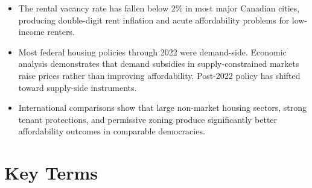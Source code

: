 \begin{itemize}
  \item The rental vacancy rate has fallen below 2\% in most major
        Canadian cities, producing double-digit rent inflation and
        acute affordability problems for low-income renters.

  \item Most federal housing policies through 2022 were demand-side.
        Economic analysis demonstrates that demand subsidies in
        supply-constrained markets raise prices rather than improving
        affordability. Post-2022 policy has shifted toward supply-side
        instruments.

  \item International comparisons show that large non-market housing
        sectors, strong tenant protections, and permissive zoning produce
        significantly better affordability outcomes in comparable democracies.
\end{itemize}

\section*{Key Terms}

